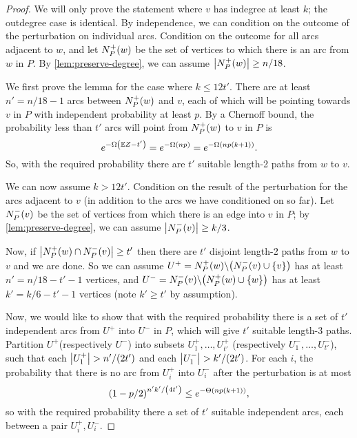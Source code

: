 \documentclass[11pt,english]{article}
\theoremstyle{plain}
\theoremstyle{definition}
\theoremstyle{definition}
\theoremstyle{plain}
\theoremstyle{plain}
\theoremstyle{plain}
\theoremstyle{plain}
\theoremstyle{remark}
\theoremstyle{remark}
\let\originalleft\left
\let\originalright\right
\renewcommand{\left}{\mathopen{}\mathclose\bgroup\originalleft}
\renewcommand{\right}{\aftergroup\egroup\originalright}
\begin{document}
\begin{proof}
We will only prove the statement where $v$ has indegree at least
$k$; the outdegree case is identical. By independence, we can condition
on the outcome of the perturbation on individual arcs. Condition on
the outcome for all arcs adjacent to $w$, and let $N_{P}^{+}\left(w\right)$
be the set of vertices to which there is an arc from $w$ in $P$.
By \ref{lem:preserve-degree}, we can assume $\left|N_{P}^{+}\left(w\right)\right|\ge n/18$.

We first prove the lemma for the case where $k\le12t'$. There are
at least $n'=n/18-1$ arcs between $N_{P}^{+}\left(w\right)$ and
$v$, each of which will be pointing towards $v$ in $P$ with independent
probability at least $p$. By a Chernoff bound, the probability less
than $t'$ arcs will point from $N_{P}^{+}\left(w\right)$ to $v$
in $P$ is
\[
e^{-\Omega\left(\E Z-t'\right)}=e^{-\Omega\left(np\right)}=e^{-\Omega\left(np\left(k+1\right)\right)}.
\]
So, with the required probability there are $t'$ suitable length-2
paths from $w$ to $v$.

We can now assume $k>12t'$. Condition on the result of the perturbation
for the arcs adjacent to $v$ (in addition to the arcs we have conditioned
on so far). Let $N_{P}^{-}\left(v\right)$ be the set of vertices
from which there is an edge into $v$ in $P$; by \ref{lem:preserve-degree},
we can assume $\left|N_{P}^{-}\left(v\right)\right|\ge k/3$.

Now, if $\left|N_{P}^{+}\left(w\right)\cap N_{P}^{-}\left(v\right)\right|\ge t'$
then there are $t'$ disjoint length-2 paths from $w$ to $v$ and
we are done. So we can assume $U^{+}=N_{P}^{+}\left(w\right)\backslash\left(N_{P}^{-}\left(v\right)\cup\left\{ v\right\} \right)$
has at least $n'=n/18-t'-1$ vertices, and $U^{-}=N_{P}^{-}\left(v\right)\backslash\left(N_{P}^{+}\left(w\right)\cup\left\{ w\right\} \right)$
has at least $k'=k/6-t'-1$ vertices (note $k'\ge t'$ by assumption).

Now, we would like to show that with the required probability there
is a set of $t'$ independent arcs from $U^{+}$ into $U^{-}$ in
$P$, which will give $t'$ suitable length-3 paths. Partition $U^{+}$(respectively
$U^{-}$) into subsets $U_{1}^{+},\dots,U_{t'}^{+}$ (respectively
$U_{1}^{-},\dots,U_{t'}^{-}$), such that each $\left|U_{1}^{+}\right|>n'/\left(2t'\right)$
and each $\left|U_{1}^{-}\right|>k'/\left(2t'\right)$. For each $i$,
the probability that there is no arc from $U_{i}^{+}$ into $U_{i}^{-}$
after the perturbation is at most
\[
\left(1-p/2\right)^{n'k'/\left(4t'\right)}\le e^{-\Theta\left(np\left(k+1\right)\right)},
\]
so with the required probability there a set of $t'$ suitable independent
arcs, each between a pair $U_{i}^{+},U_{i}^{-}$.\end{proof}
\end{document}
